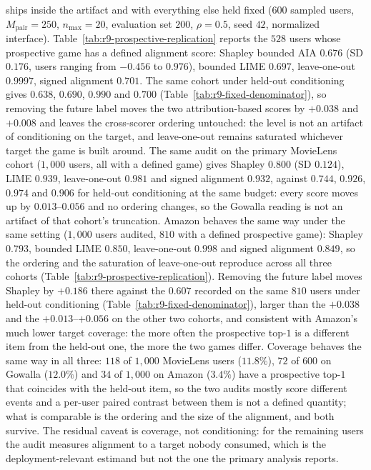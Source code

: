 \documentclass[manuscript,screen,anonymous]{acmart}
\begin{document}
ships inside the artifact and with everything else held fixed ($600$ sampled users,
$M_{\mathrm{pair}}=250$, $n_{\max}=20$, evaluation set $200$, $\rho=0.5$, seed $42$,
normalized interface). Table~\ref{tab:r9-prospective-replication} reports the
$528$ users whose prospective game has a defined alignment score: Shapley bounded AIA
$0.676$ (SD $0.176$, users ranging from $-0.456$ to $0.976$), bounded LIME $0.697$,
leave-one-out $0.9997$, signed alignment $0.701$. The same cohort under
held-out conditioning gives $0.638$, $0.690$, $0.990$ and $0.700$
(Table~\ref{tab:r9-fixed-denominator}), so removing the future label moves the two
attribution-based scores by $+0.038$ and $+0.008$ and leaves the cross-scorer ordering
untouched: the level is not an artifact of conditioning on the target, and
leave-one-out remains saturated whichever target the game is built around. The same audit on the primary
MovieLens cohort ($1{,}000$ users, all with a defined game) gives Shapley $0.800$
(SD $0.124$), LIME $0.939$, leave-one-out $0.981$ and signed alignment $0.932$, against
$0.744$, $0.926$, $0.974$ and $0.906$ for held-out conditioning at the same budget: every
score moves up by $0.013$--$0.056$ and no ordering changes, so the Gowalla reading is
not an artifact of that cohort's truncation. Amazon behaves the same way under the same
setting ($1{,}000$ users audited, $810$ with a defined prospective game): Shapley
$0.793$, bounded LIME $0.850$, leave-one-out $0.998$ and signed alignment $0.849$, so the
ordering and the saturation of leave-one-out reproduce across all three cohorts
(Table~\ref{tab:r9-prospective-replication}). Removing the future label moves Shapley by
$+0.186$ there against the $0.607$ recorded on the same $810$ users under held-out
conditioning (Table~\ref{tab:r9-fixed-denominator}), larger than the $+0.038$ and the
$+0.013$--$+0.056$ on the other two cohorts, and consistent with Amazon's much lower
target coverage: the more often the prospective top-$1$ is a different item from the
held-out one, the more the two games differ. Coverage behaves the same way in all three:
$118$ of $1{,}000$ MovieLens users ($11.8\%$), $72$ of $600$ on Gowalla ($12.0\%$) and
$34$ of $1{,}000$ on Amazon ($3.4\%$) have a
prospective top-$1$ that coincides with the held-out item, so the two audits mostly score
different events and a per-user paired contrast between them is not a defined quantity; what is comparable is the
ordering and the size of the alignment, and both survive. The residual caveat is
coverage, not conditioning: for the remaining users the audit measures alignment to a
target nobody consumed, which is the deployment-relevant estimand but not the one the
primary analysis reports.
\end{document}
